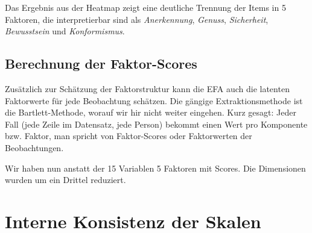 \documentclass[12pt,ngerman,]{book}
\makeatletter
\newenvironment{Shaded}{\begin{snugshade}}{\end{snugshade}}
\newcommand{\KeywordTok}[1]{\textcolor[rgb]{0.13,0.29,0.53}{\textbf{{#1}}}}
\newcommand{\DataTypeTok}[1]{\textcolor[rgb]{0.13,0.29,0.53}{{#1}}}
\newcommand{\DecValTok}[1]{\textcolor[rgb]{0.00,0.00,0.81}{{#1}}}
\newcommand{\StringTok}[1]{\textcolor[rgb]{0.31,0.60,0.02}{{#1}}}
\newcommand{\CommentTok}[1]{\textcolor[rgb]{0.56,0.35,0.01}{\textit{{#1}}}}
\newcommand{\NormalTok}[1]{{#1}}
\newenvironment{kframe}{%
\medskip{}
\setlength{\fboxsep}{.8em}
 \def\at@end@of@kframe{}%
 \ifinner\ifhmode%
  \def\at@end@of@kframe{\end{minipage}}%
  \begin{minipage}{\columnwidth}%
 \fi\fi%
 \def\FrameCommand##1{\hskip\@totalleftmargin \hskip-\fboxsep
 \colorbox{shadecolor}{##1}\hskip-\fboxsep
     \hskip-\linewidth \hskip-\@totalleftmargin \hskip\columnwidth}%
 \MakeFramed {\advance\hsize-\width
   \@totalleftmargin\z@ \linewidth\hsize
   \@setminipage}}%
 {\par\unskip\endMakeFramed%
 \at@end@of@kframe}
\renewenvironment{Shaded}{\begin{kframe}}{\end{kframe}}
\theoremstyle{definition}
\theoremstyle{definition}
\theoremstyle{remark}
\makeatother
\begin{document}
Das Ergebnis aus der Heatmap zeigt eine deutliche Trennung der Items in
5 Faktoren, die interpretierbar sind als \emph{Anerkennung},
\emph{Genuss}, \emph{Sicherheit}, \emph{Bewusstsein} und
\emph{Konformismus}.

\subsection{Berechnung der
Faktor-Scores}\label{berechnung-der-faktor-scores}

Zusätzlich zur Schätzung der Faktorstruktur kann die EFA auch die
latenten Faktorwerte für jede Beobachtung schätzen. Die gängige
Extraktionsmethode ist die Bartlett-Methode, worauf wir hir nicht weiter
eingehen. Kurz gesagt: Jeder Fall (jede Zeile im Datensatz, jede Person)
bekommt einen Wert pro Komponente bzw. Faktor, man spricht von
Faktor-Scores oder Faktorwerten der Beobachtungen.

\begin{Shaded}
\end{Shaded}

Wir haben nun anstatt der 15 Variablen 5 Faktoren mit Scores. Die
Dimensionen wurden um ein Drittel reduziert.

\section{Interne Konsistenz der
Skalen}\label{interne-konsistenz-der-skalen}
\end{document}
